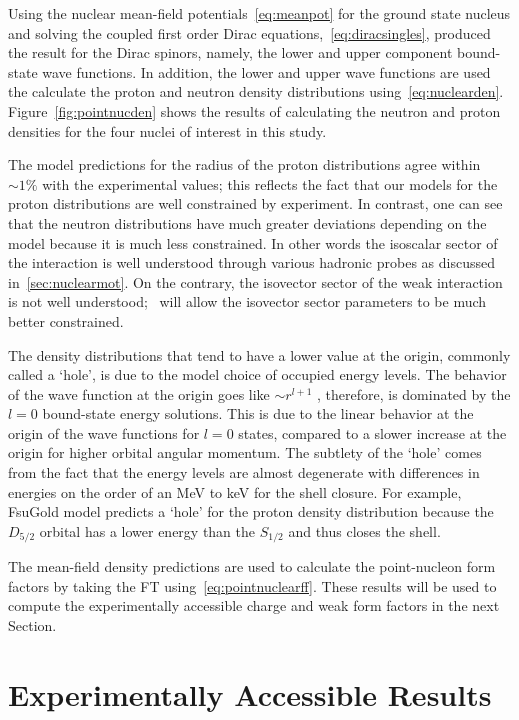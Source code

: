 Using the nuclear mean-field potentials~\eqref{eq:meanpot} for the ground state nucleus and solving the coupled first order Dirac equations,~\eqref{eq:diracsingles}, produced the result for the Dirac spinors, namely, the lower and upper component bound-state wave functions. In addition, the lower and upper wave functions are used the calculate the proton and neutron density distributions using~\eqref{eq:nuclearden}. Figure~\ref{fig:pointnucden} shows the results of calculating the neutron and proton densities for the four nuclei of interest in this study. 

The model predictions for the radius of the proton distributions agree within $\sim 1\% $ with the experimental values; this reflects the fact that our models for the proton distributions are well constrained by experiment. In contrast, one can see that the neutron distributions have much greater deviations depending on the model because it is much less constrained. In other words the isoscalar sector of the interaction is well understood through various hadronic probes as discussed in~\ref{sec:nuclearmot}. On the contrary, the isovector sector of the weak interaction is not well understood; \cevns\ will allow the isovector sector parameters to be  much better constrained. 

The density distributions that tend to have a lower value at the origin, commonly called a `hole', is due to the model choice of occupied energy levels. The behavior of the wave function at the origin goes like $\sim r^{l+1}$ , therefore, is dominated by the $l=0$ bound-state energy solutions. This is due to the linear behavior at the origin of the wave functions for $l=0$ states, compared to a slower increase at the origin for higher orbital angular momentum. The subtlety of the `hole' comes from the fact that the energy levels are almost degenerate with differences in energies on the order of an MeV to keV for the shell closure. For example, FsuGold model predicts a `hole' for the proton density distribution because the $D_{5/2}$ orbital has a lower energy than the $S_{1/2}$ and thus closes the shell. 

The mean-field density predictions are used to calculate the point-nucleon form factors by taking the FT using~\eqref{eq:pointnuclearff}. These results will be used to compute the experimentally accessible charge and weak form factors in the next Section.

\section{Experimentally Accessible Results}


